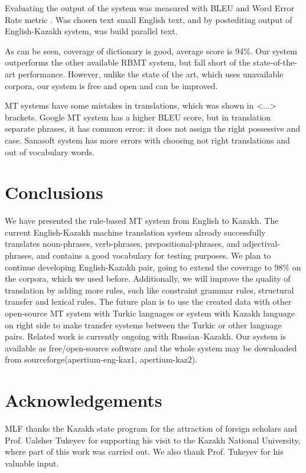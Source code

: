 \documentclass[11pt]{article}
\begin{document}
Evaluating the output of the system was measured with BLEU \citep{papineni02} and Word Error Rate 
metric \citep{levenshtein/1966}. Was chosen text small English text, and by postediting output 
of English-Kazakh system, was build parallel text.

As can be seen,  coverage of dictionary is good, average score is 94\%. Our system outperforms the other 
available RBMT system, but fall short of the state-of-the-art performance. However, unlike the state of 
the art, which uses unavailable corpora, our system is free and open and can be improved.

MT systems have some mistakes in translations, which was shown in <...> brackets. Google MT system 
has a higher BLEU score, but in translation separate phrases, it has common error: it does not assign 
the right possessive and case. Sanasoft system has more errors with choosing not right translations 
and out of vocabulary words.

\section{Conclusions}

We have presented the rule-based MT system from English to Kazakh. The current English-Kazakh machine translation system already successfully translates noun-phrases, verb-phrases, prepositional-phrases, and adjectival-phrases, and contains a good vocabulary for testing purposes. 
We plan to continue developing English-Kazakh pair, going to extend the coverage to 98\% on the corpora, which we used before. Additionally, we will improve the quality of translation by adding more rules, such like constraint grammar rules, structural transfer and lexical rules. The future plan is to use the created data with other open-source MT system with Turkic languages or system with Kazakh language on right side to make transfer systems between the Turkic or other language pairs. Related work is currently ongoing with Russian--Kazakh. 
Our system is available as free/open-source software and the whole system may be downloaded from sourceforge(apertium-eng-kaz1, apertium-kaz2).

\section*{Acknowledgements}

MLF thanks the Kazakh state program for the attraction of foreign scholars and Prof. Ualsher Tukeyev for supporting his visit to the Kazakh National University, where part of this work was carried out. We also thank Prof. Tukeyev for his valuable input.
\end{document}
